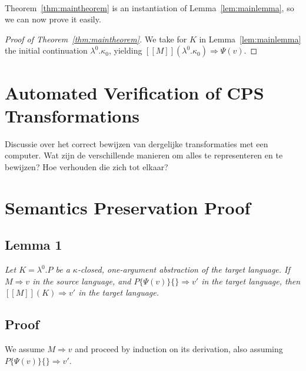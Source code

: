 \documentclass[a4paper,11pt,draft]{article}
\begin{document}
\paragraph{}

Theorem~\ref{thm:maintheorem} is an instantiation of
Lemma~\ref{lem:mainlemma}, so we can now prove it easily.

\begin{proof}[Proof of Theorem~\ref{thm:maintheorem}]
We take for $K$ in Lemma~\ref{lem:mainlemma} the initial continuation
$\lambda^{0}.\kappa_{0}$, yielding
$[\![M]\!] (\lambda^{0}.\kappa_{0}) \Rightarrow \Psi(v)$.
\end{proof}


\section{Automated Verification of CPS Transformations}\label{sec:automated}

Discussie over het correct bewijzen van dergelijke transformaties met een
computer. Wat zijn de verschillende manieren om alles te representeren en te
bewijzen? Hoe verhouden die zich tot elkaar?


\appendix


\section{Semantics Preservation Proof}\label{sec:proof}

\subsection*{Lemma 1}

{\em
  Let $K = \lambda^{0}.P$ be a $\kappa$-closed, one-argument
  abstraction of the target language. If $M \Rightarrow v$ in the
  source language, and $P\{\Psi(v)\}\{\} \Rightarrow v'$ in the target
  language, then $[\![M]\!](K) \Rightarrow v'$ in the target language.
}

\subsection*{Proof}

We assume $M \Rightarrow v$ and proceed by induction on its derivation, also
assuming $P\{\Psi(v)\}\{\} \Rightarrow v'$.
\end{document}
